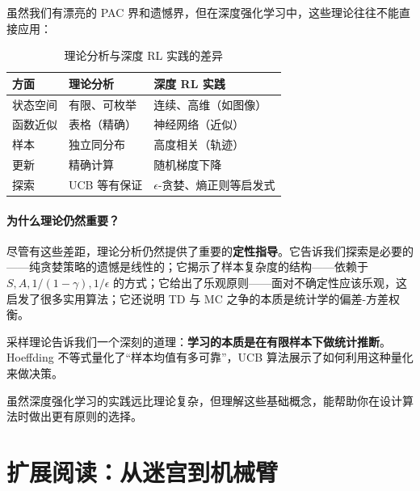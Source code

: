 虽然我们有漂亮的 PAC 界和遗憾界，但在深度强化学习中，这些理论往往不能直接应用：

\begin{table}[htbp]
\centering
\renewcommand{\arraystretch}{1.4}
\small
\begin{tabularx}{\textwidth}{p{2.2cm}|X|X}
\toprule
\textbf{方面} & \textbf{理论分析} & \textbf{深度 RL 实践} \\
\midrule
状态空间 & 有限、可枚举 & 连续、高维（如图像） \\
\midrule
函数近似 & 表格（精确） & 神经网络（近似） \\
\midrule
样本 & 独立同分布 & 高度相关（轨迹） \\
\midrule
更新 & 精确计算 & 随机梯度下降 \\
\midrule
探索 & UCB 等有保证 & $\epsilon$-贪婪、熵正则等启发式 \\
\bottomrule
\end{tabularx}
\caption{理论分析与深度 RL 实践的差异}
\end{table}

\paragraph{为什么理论仍然重要？}

尽管有这些差距，理论分析仍然提供了重要的\textbf{定性指导}。它告诉我们探索是必要的——纯贪婪策略的遗憾是线性的；它揭示了样本复杂度的结构——依赖于 $S, A, 1/(1-\gamma), 1/\epsilon$ 的方式；它给出了乐观原则——面对不确定性应该乐观，这启发了很多实用算法；它还说明 TD 与 MC 之争的本质是统计学的偏差-方差权衡。


\begin{remark}
采样理论告诉我们一个深刻的道理：\textbf{学习的本质是在有限样本下做统计推断}。Hoeffding 不等式量化了“样本均值有多可靠”，UCB 算法展示了如何利用这种量化来做决策。

虽然深度强化学习的实践远比理论复杂，但理解这些基础概念，能帮助你在设计算法时做出更有原则的选择。
\end{remark}


\section*{扩展阅读：从迷宫到机械臂}

